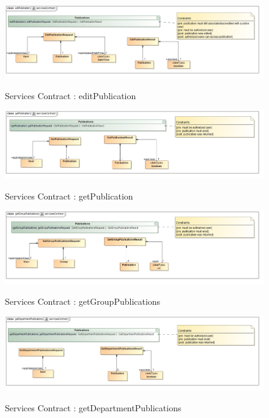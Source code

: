 \documentclass{article}
\begin{document}
		\begin{figure}[H]
		\includegraphics[width=\textwidth]{Quinton_Diagrams/class__editPublication__servicesContract.jpg}  \\
		\caption{Services Contract : editPublication}
		\end{figure}
		
		\begin{figure}[H]
		\includegraphics[width=\textwidth]{Quinton_Diagrams/class__getPublication__servicesContract.jpg}  \\
		\caption{Services Contract : getPublication}
		\end{figure}
		
		\begin{figure}[H]
		\includegraphics[width=\textwidth]{Quinton_Diagrams/class__getGroupPublications__servicesContract.jpg}  \\
		\caption{Services Contract : getGroupPublications}
		\end{figure}
		
		\begin{figure}[H]
		\includegraphics[width=\textwidth]{Quinton_Diagrams/class__getDepartmentPublications__servicesContract.jpg}  \\
		\caption{Services Contract : getDepartmentPublications}
		\end{figure}
		
\end{document}
